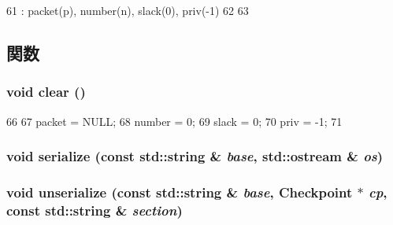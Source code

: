 \begin{DoxyCode}
61         : packet(p), number(n), slack(0), priv(-1)
62     {
63     }
\end{DoxyCode}


\subsection{関数}
\hypertarget{structPacketFifoEntry_ac8bb3912a3ce86b15842e79d0b421204}{
\subsubsection[{clear}]{\setlength{\rightskip}{0pt plus 5cm}void clear ()}}
\label{structPacketFifoEntry_ac8bb3912a3ce86b15842e79d0b421204}



\begin{DoxyCode}
66     {
67         packet = NULL;
68         number = 0;
69         slack = 0;
70         priv = -1;
71     }
\end{DoxyCode}
\hypertarget{structPacketFifoEntry_ab4138b21b48e3371a8e20df72b675a88}{
\subsubsection[{serialize}]{\setlength{\rightskip}{0pt plus 5cm}void serialize (const std::string \& {\em base}, \/  std::ostream \& {\em os})}}
\label{structPacketFifoEntry_ab4138b21b48e3371a8e20df72b675a88}
\hypertarget{structPacketFifoEntry_a147c320e3d6506edf5587a40cd8e430d}{
\subsubsection[{unserialize}]{\setlength{\rightskip}{0pt plus 5cm}void unserialize (const std::string \& {\em base}, \/  {\bf Checkpoint} $\ast$ {\em cp}, \/  const std::string \& {\em section})}}
\label{structPacketFifoEntry_a147c320e3d6506edf5587a40cd8e430d}


